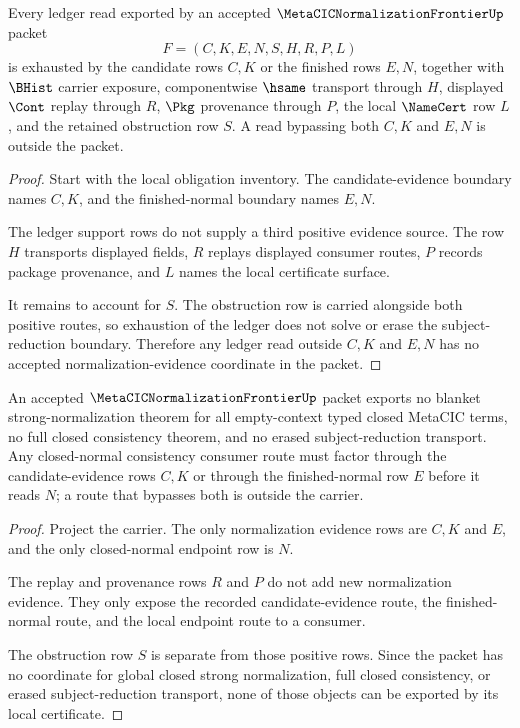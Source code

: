 \begin{theorem}
\label{thm:metacic-normalization-frontier-ledger-exhaustion}
Every ledger read exported by an accepted $\MetaCICNormalizationFrontierUp$ packet
$$
F=(C,K,E,N,S,H,R,P,L)
$$
is exhausted by the candidate rows $C,K$ or the finished rows $E,N$, together with $\BHist$ carrier exposure, componentwise $\hsame$ transport through $H$, displayed $\Cont$ replay through $R$, $\Pkg$ provenance through $P$, the local $\NameCert$ row $L$, and the retained obstruction row $S$. A read bypassing both $C,K$ and $E,N$ is outside the packet.
\end{theorem}
\begin{proof}
Start with the local obligation inventory. The candidate-evidence boundary names $C,K$, and the finished-normal boundary names $E,N$.

The ledger support rows do not supply a third positive evidence source. The row $H$ transports displayed fields, $R$ replays displayed consumer routes, $P$ records package provenance, and $L$ names the local certificate surface.

It remains to account for $S$. The obstruction row is carried alongside both positive routes, so exhaustion of the ledger does not solve or erase the subject-reduction boundary. Therefore any ledger read outside $C,K$ and $E,N$ has no accepted normalization-evidence coordinate in the packet.
\end{proof}

\begin{theorem}
\label{thm:metacic-normalization-frontier-nonescape}
An accepted $\MetaCICNormalizationFrontierUp$ packet exports no blanket strong-normalization theorem for all empty-context typed closed MetaCIC terms, no full closed consistency theorem, and no erased subject-reduction transport. Any closed-normal consistency consumer route must factor through the candidate-evidence rows $C,K$ or through the finished-normal row $E$ before it reads $N$; a route that bypasses both is outside the carrier.
\end{theorem}
\begin{proof}
Project the carrier. The only normalization evidence rows are $C,K$ and $E$, and the only closed-normal endpoint row is $N$.

The replay and provenance rows $R$ and $P$ do not add new normalization evidence. They only expose the recorded candidate-evidence route, the finished-normal route, and the local endpoint route to a consumer.

The obstruction row $S$ is separate from those positive rows. Since the packet has no coordinate for global closed strong normalization, full closed consistency, or erased subject-reduction transport, none of those objects can be exported by its local certificate.
\end{proof}

